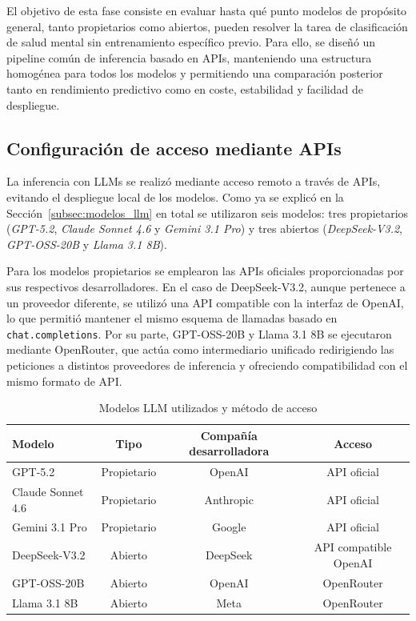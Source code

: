 El objetivo de esta fase consiste en evaluar hasta qué punto modelos de propósito general, tanto propietarios como abiertos, pueden resolver la tarea de clasificación de salud mental sin entrenamiento específico previo. Para ello, se diseñó un pipeline común de inferencia basado en \acp{API}, manteniendo una estructura homogénea para todos los modelos y permitiendo una comparación posterior tanto en rendimiento predictivo como en coste, estabilidad y facilidad de despliegue.

\subsection{Configuración de acceso mediante APIs}

La inferencia con \acp{LLM} se realizó mediante acceso remoto a través de \acp{API}, evitando el despliegue local de los modelos. Como ya se explicó en la Sección~\ref{subsec:modelos_llm} en total se utilizaron seis modelos: tres propietarios (\textit{GPT-5.2}, \textit{Claude Sonnet 4.6} y \textit{Gemini 3.1 Pro}) y tres abiertos (\textit{DeepSeek-V3.2}, \textit{GPT-OSS-20B} y \textit{Llama 3.1 8B}).

Para los modelos propietarios se emplearon las \acp{API} oficiales proporcionadas por sus respectivos desarrolladores. En el caso de DeepSeek-V3.2, aunque pertenece a un proveedor diferente, se utilizó una \ac{API} compatible con la interfaz de OpenAI, lo que permitió mantener el mismo esquema de llamadas basado en \texttt{chat.completions}. Por su parte, GPT-OSS-20B y Llama 3.1 8B se ejecutaron mediante OpenRouter, que actúa como intermediario unificado redirigiendo las peticiones a distintos proveedores de inferencia y ofreciendo compatibilidad con el mismo formato de API.

\begin{table}[H]
	\centering
	\caption{Modelos LLM utilizados y método de acceso}
	\label{tab:llm_access}
	\begin{tabular}{|l|c|c|c|}
		\hline
		\textbf{Modelo} & \textbf{Tipo} & \textbf{Compañía desarrolladora} & \textbf{Acceso} \\
		\hline
		GPT-5.2 & Propietario & OpenAI & API oficial \\
		Claude Sonnet 4.6 & Propietario & Anthropic & API oficial \\
		Gemini 3.1 Pro & Propietario & Google & API oficial \\
		DeepSeek-V3.2 & Abierto & DeepSeek & API compatible OpenAI \\
		GPT-OSS-20B & Abierto & OpenAI & OpenRouter \\
		Llama 3.1 8B & Abierto & Meta & OpenRouter \\
		\hline
	\end{tabular}
\end{table}


